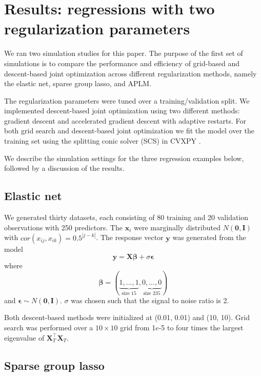 \documentclass[12pt,letterpaper]{article}
\begin{document}
\section{Results: regressions with two regularization parameters}\label{sec:results1}\label{results1}

We ran two simulation studies for this paper. The purpose of the first set of simulations is to compare the performance and efficiency of grid-based and descent-based joint optimization across different regularization methods, namely the elastic net, sparse group lasso, and APLM.

The regularization parameters were tuned over a training/validation split. We implemented descent-based joint optimization using two different methods:  gradient descent and accelerated gradient descent with adaptive restarts. For both grid search and descent-based joint optimization we fit the model over the training set using the splitting conic solver (SCS) in CVXPY \citep{cvxpy}.

We describe the simulation settings for the three regression examples below, followed by a discussion of the results.

\subsection{Elastic net}
We generated thirty datasets, each consisting of 80 training and 20 validation observations with 250 predictors. The $\boldsymbol x_i$ were marginally distributed $N(\boldsymbol 0,\boldsymbol I)$ with $cor(x_{ij},x_{ik}) = 0.5^{|j-k|}$.
The response vector $\boldsymbol y$ was generated from the model
\begin{equation}
\boldsymbol y = \boldsymbol X \boldsymbol \beta + \sigma \boldsymbol \epsilon
\end{equation}
where
\begin{equation}
\boldsymbol \beta = (\underbrace{1, ..., 1}_\text{size 15}, \underbrace{0, ..., 0}_\text{size 235})
\end{equation}
and $\boldsymbol \epsilon \sim N(\boldsymbol 0, \boldsymbol I)$. $\sigma$ was chosen such that the signal to noise ratio is 2. 

Both descent-based methods were initialized at (0.01, 0.01) and (10, 10). Grid search was performed over a $10 \times 10$ grid from 1$e$-5 to four times the largest eigenvalue of $\boldsymbol X_T^\top \boldsymbol X_T$.

\subsection{Sparse group lasso}\label{sec:simulationSGL}
\end{document}
